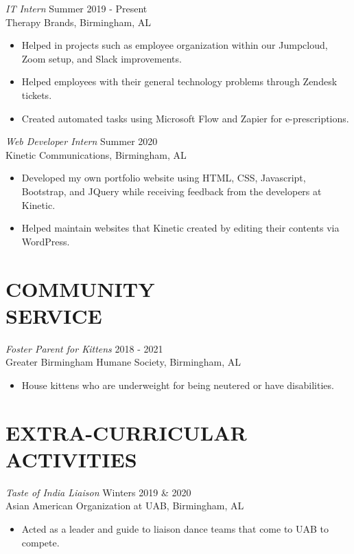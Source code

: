 \documentclass[margin, 10pt]{res} %
\begin{document}
\begin{resume}
{\sl IT Intern} \hfill Summer 2019 - Present \\
Therapy Brands, Birmingham, AL 
\begin{itemize} \itemsep -2pt %
\item Helped in projects such as employee organization within our Jumpcloud, Zoom setup, and Slack improvements.
\item Helped employees with their general technology problems through Zendesk tickets.
\item Created automated tasks using Microsoft Flow and Zapier for e-prescriptions.
\end{itemize} 

{\sl Web Developer Intern} \hfill Summer 2020 \\
Kinetic Communications, Birmingham, AL
\begin{itemize} \itemsep -2pt %
\item Developed my own portfolio website using HTML, CSS, Javascript, Bootstrap, and JQuery while receiving feedback from the developers at Kinetic. 
\item Helped maintain websites that Kinetic created by editing their contents via WordPress. 
\end{itemize}

\section{COMMUNITY \\ SERVICE}

{\sl Foster Parent for Kittens} \hfill 2018 - 2021 \\
Greater Birmingham Humane Society, Birmingham, AL
\begin{itemize}
\item House kittens who are underweight for being neutered or have disabilities.
\end{itemize}


\section{EXTRA-CURRICULAR \\ ACTIVITIES} 

{\sl Taste of India Liaison} \hfill Winters 2019 \& 2020 \\
Asian American Organization at UAB, Birmingham, AL
\begin{itemize}
\item Acted as a leader and guide to liaison dance teams that come to UAB to compete.
\end{itemize}


\end{resume}
\end{document}
